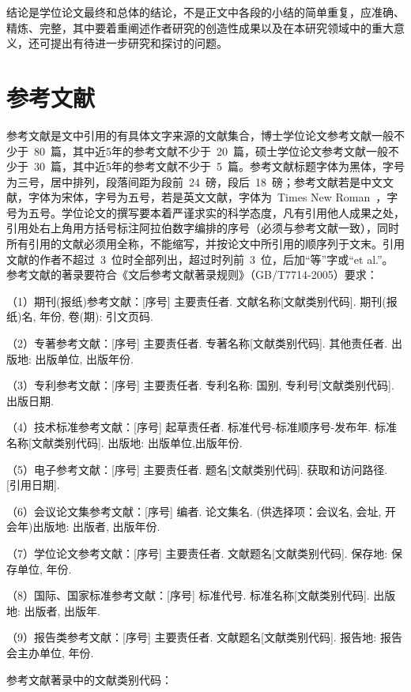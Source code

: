 结论是学位论文最终和总体的结论，不是正文中各段的小结的简单重复，应准确、精炼、完整，其中要着重阐述作者研究的创造性成果以及在本研究领域中的重大意义，还可提出有待进一步研究和探讨的问题。

\section{参考文献}

参考文献是文中引用的有具体文字来源的文献集合，博士学位论文参考文献一般不少于~80~篇，其中近5年的参考文献不少于~20~篇，硕士学位论文参考文献一般不少于~30~篇，其中近5年的参考文献不少于~5~篇。参考文献标题字体为黑体，字号为三号，居中排列，段落间距为段前~24~磅，段后~18~磅；参考文献若是中文文献，字体为宋体，字号为五号，若是英文文献，字体为~Times New Roman~，字号为五号。学位论文的撰写要本着严谨求实的科学态度，凡有引用他人成果之处，引用处右上角用方括号标注阿拉伯数字编排的序号（必须与参考文献一致），同时所有引用的文献必须用全称，不能缩写，并按论文中所引用的顺序列于文末。引用文献的作者不超过~3~位时全部列出，超过时列前~3~位，后加“等”字或“et al.”。 参考文献的著录要符合《文后参考文献著录规则》（GB/T7714-2005）要求：

（1）期刊(报纸)参考文献：[序号] 主要责任者. 文献名称[文献类别代码]. 期刊(报纸)名, 年份, 卷(期): 引文页码.

（2）专著参考文献：[序号] 主要责任者. 专著名称[文献类别代码]. 其他责任者. 出版地: 出版单位, 出版年份.

（3）专利参考文献：[序号] 主要责任者. 专利名称: 国别, 专利号[文献类别代码]. 出版日期.

（4）技术标准参考文献：[序号] 起草责任者. 标准代号-标准顺序号-发布年. 标准名称[文献类别代码]. 出版地: 出版单位,出版年份.

（5）电子参考文献：[序号] 主要责任者. 题名[文献类别代码]. 获取和访问路径. [引用日期].

（6）会议论文集参考文献：[序号] 编者. 论文集名. (供选择项：会议名, 会址, 开会年)出版地: 出版者, 出版年份.

（7）学位论文参考文献：[序号]  主要责任者. 文献题名[文献类别代码]. 保存地: 保存单位, 年份.

（8）国际、国家标准参考文献：[序号] 标准代号. 标准名称[文献类别代码]. 出版地: 出版者, 出版年.

（9）报告类参考文献：[序号] 主要责任者. 文献题名[文献类别代码]. 报告地: 报告会主办单位, 年份.

参考文献著录中的文献类别代码：

